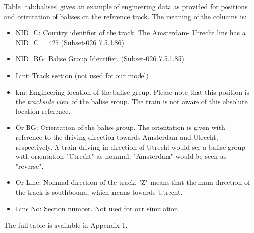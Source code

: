 \documentclass{template/openetcs_article}
\begin{document}
Table \ref {tab:balises} gives an example of engineering data as provided for positions and orientation of balises on the reference track.
The meaning of the columns is:
\begin{itemize}
 \item NID\_C: Country identifier of the track. The Amsterdam- Utrecht line has a NID\_C = 426 (Subset-026 7.5.1.86)\cite{SRS026-7}
 \item NID\_BG: Balise Group Identifier. (Subset-026 7.5.1.85)\cite{SRS026-7}
 \item Lint: Track section (not used for our model)
 \item km: Engineering location of the balise group. Please note that this position is the \emph{trackside view} of the balise group. The train is not aware of this absolute location reference.
 \item Or BG: Orientation of the balise group. The orientation is given with reference to the driving direction towards Amsterdam and Utrecht, respectively. A train driving in direction of Utrecht would see a balise group with orientation "Utrecht" as nominal, "Amsterdam" would be seen as "reverse".
 \item Or Line: Nominal direction of the track. "Z" means that the main direction of the track is southbound, which means towards Utrecht.
 \item Line No: Section number. Not used for our simulation.
 \end {itemize}

The full table is available in Appendix 1.
\end{document}
